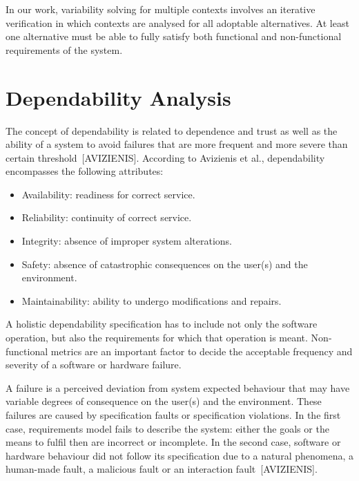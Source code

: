 In our work, variability solving for multiple contexts involves an iterative verification in which contexts are analysed for all adoptable alternatives. At least one alternative must be able to fully satisfy both functional and non-functional requirements of the system.


\section{Dependability Analysis}

The concept of dependability is related to dependence and trust as well as the ability of a system to avoid failures that are more frequent and more severe than certain threshold~[AVIZIENIS]. According to Avizienis et al., dependability encompasses the following attributes: 

\begin{itemize}

\item Availability: readiness for correct service.
\medskip

\item Reliability: continuity of correct service.
\medskip

\item Integrity: absence of improper system alterations.
\medskip

\item Safety: absence of catastrophic consequences on the user(s) and the environment.
\medskip

\item Maintainability: ability to undergo modifications and repairs.
\medskip

\end{itemize}


A holistic dependability specification has to include not only the software operation, but also the requirements for which that operation is meant. Non-functional metrics are an important factor to decide the acceptable frequency and severity of a software or hardware failure. 

A failure is a perceived deviation from system expected behaviour that may have variable degrees of consequence on the user(s) and the environment. These failures are caused by specification faults or specification violations. In the first case, requirements model fails to describe the system: either the goals or the means to fulfil then are incorrect or incomplete. In the second case, software or hardware behaviour did not follow its specification due to a natural phenomena, a human-made fault, a malicious fault or an interaction fault~[AVIZIENIS].

